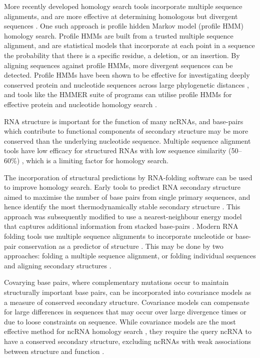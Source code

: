 More recently developed homology search tools incorporate multiple sequence alignments, and are more effective at determining homologous but divergent sequences \citep{Park1998-lu,Lindahl2000-ra}. One such approach is profile hidden Markov model (profile HMM) homology search. Profile HMMs are built from a trusted multiple sequence alignment, and are statistical models that incorporate at each point in a sequence the probability that there is a specific residue, a deletion, or an insertion. By aligning sequences against profile HMMs, more divergent sequences can be detected. Profile HMMs have been shown to be effective for investigating deeply conserved protein \citep{Madera2002-mk} and nucleotide sequences across large phylogenetic distances \citep{Freyhult2007-gz}, and tools like the HMMER \citep{Eddy2009-hmmer} suite of programs can utilise profile HMMs for effective protein and nucleotide homology search \citep{Eddy2011-hi}.\par

RNA structure is important for the function of many ncRNAs, and base-pairs which contribute to functional components of secondary structure may be more conserved than the underlying nucleotide sequence. Multiple sequence alignment tools have low efficacy for structured RNAs with low sequence similarity (50--60\%) \citep{Gardner2005-la}, which is a limiting factor for homology search.

The incorporation of structural predictions by RNA-folding software can be used to improve homology search. Early tools to predict RNA secondary structure aimed to maximise the number of base pairs from single primary sequences, and hence identify the most thermodynamically stable secondary structure \citep{tinoco1971,tinoco1973,Nussinov1980-ka}. This approach was subsequently modified to use a nearest-neighbour energy model that captures additional information from stacked base-pairs \citep{Zuker1981-er}. Modern RNA folding tools use multiple sequence alignments to incorporate nucleotide or base-pair conservation as a predictor of structure \citep{Bujnicki_2013}. This may be done by two approaches: folding a multiple sequence alignment, or folding individual sequences and aligning secondary structures \citep{Gardner2004-uo}.

Covarying base pairs, where complementary mutations occur to maintain structurally important base pairs, can be incorporated into covariance models as a measure of conserved secondary structure. Covariance models can compensate for large differences in sequences that may occur over large divergence times or due to loose constraints on sequence. While covariance models are the most effective method for ncRNA homology search \citep{Freyhult2007-gz}, they require the query ncRNA to have a conserved secondary structure, excluding ncRNAs with weak associations between structure and function \citep{Peterman2014-cs,Rivas2017-lg}.\par

